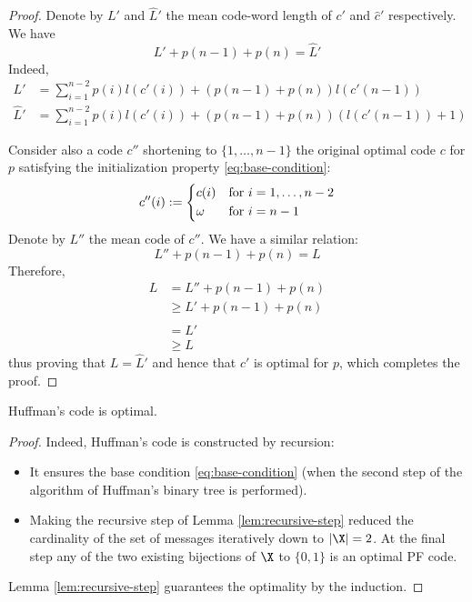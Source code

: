 \documentclass[toc]{../cs-classes/cs-classes}
\begin{document}
\begin{proof}
    Denote by $L'$ and $\hat{L}'$ the mean code-word length of $c'$ and $\hat{c}'$ respectively. We have
    \begin{equation*}
        L'+p(n-1)+p(n)=\hat{L}'
    \end{equation*}
    Indeed,
    \begin{equation*}
        \begin{aligned}
            L'&=\sum_{i=1}^{n-2}p(i)l(c'(i))+(p(n-1)+p(n))l(c'(n-1))\\
            \hat{L}'&=\sum_{i=1}^{n-2} p(i)l(c'(i))+(p(n-1)+p(n))(l(c'(n-1))+1)
        \end{aligned}
    \end{equation*}

    Consider also a code $c''$ shortening to $\{1, \dots, n-1\}$ the original optimal code $c$ for $p$ satisfying the initialization property \eqref{eq:base-condition}:
    \begin{equation}
        \label{eq:c-second}
        c''(i):=\begin{cases*}
            c(i) & for $i=1, \dots, n-2$\\
            \omega & for $i=n-1$
        \end{cases*}
    \end{equation}
    Denote by $L''$ the mean code of $c''$. We have a similar relation:
    \begin{equation*}
        L''+p(n-1)+p(n)=L
    \end{equation*}
    Therefore,
    \begin{equation*}
        \begin{aligned}
            L&=L''+p(n-1)+p(n)\\
            &\geq L' + p(n-1) + p(n)\\
            &=\hat{L}'\\
            &\geq L
        \end{aligned}
    \end{equation*}
    thus proving that $L=\hat{L}'$ and hence that $\hat{c}'$ is optimal for $p$, which completes the proof.
\end{proof}

\begin{corollary}
    Huffman's code is optimal.
\end{corollary}

\begin{proof}
    Indeed, Huffman's code is constructed by recursion:
    \begin{itemize}
        \item It ensures the base condition \eqref{eq:base-condition} (when the second step of the algorithm of Huffman's binary tree is performed).
        \item Making the recursive step of Lemma \ref{lem:recursive-step} reduced the cardinality of the set of messages iteratively down to $|\X|=2$. At the final step any of the two existing bijections of $\X$ to $\{0, 1\}$ is an optimal PF code.
    \end{itemize}
    Lemma \ref{lem:recursive-step} guarantees the optimality by the induction.
\end{proof}
\end{document}
